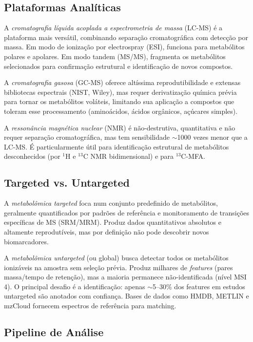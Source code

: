 \subsection{Plataformas Analíticas}

A \emph{cromatografia líquida acoplada a espectrometria de massa} (LC-MS) é a plataforma
mais versátil, combinando separação cromatográfica com detecção por massa. Em modo de
ionização por electrospray (ESI), funciona para metabólitos polares e apolares. Em modo
tandem (MS/MS), fragmenta os metabólitos selecionados para confirmação estrutural e
identificação de novos compostos.

A \emph{cromatografia gasosa} (GC-MS) oferece altíssima reprodutibilidade e extensas
bibliotecas espectrais (NIST, Wiley), mas requer derivatização química prévia para
tornar os metabólitos voláteis, limitando sua aplicação a compostos que toleram esse
processamento (aminoácidos, ácidos orgânicos, açúcares simples).

A \emph{ressonância magnética nuclear} (NMR) é não-destrutiva, quantitativa e não requer
separação cromatográfica, mas tem sensibilidade $\sim$1000 vezes menor que a LC-MS.
É particularmente útil para identificação estrutural de metabólitos desconhecidos (por
$^{1}$H e $^{13}$C NMR bidimensional) e para $^{13}$C-MFA.

\subsection{Targeted vs. Untargeted}

A \emph{metabolômica targeted} foca num conjunto predefinido de metabólitos, geralmente
quantificados por padrões de referência e monitoramento de transições específicas de MS
(SRM/MRM). Produz dados quantitativos absolutos e altamente reprodutíveis, mas por
definição não pode descobrir novos biomarcadores.

A \emph{metabolômica untargeted} (ou global) busca detectar todos os metabólitos
ionizáveis na amostra sem seleção prévia. Produz milhares de \emph{features} (pares
massa/tempo de retenção), mas a maioria permanece não-identificada (nível MSI 4). O
principal desafio é a identificação: apenas $\sim$5--30\% dos features em estudos
untargeted são anotados com confiança. Bases de dados como HMDB, METLIN e mzCloud
fornecem espectros de referência para matching.

\subsection{Pipeline de Análise}

